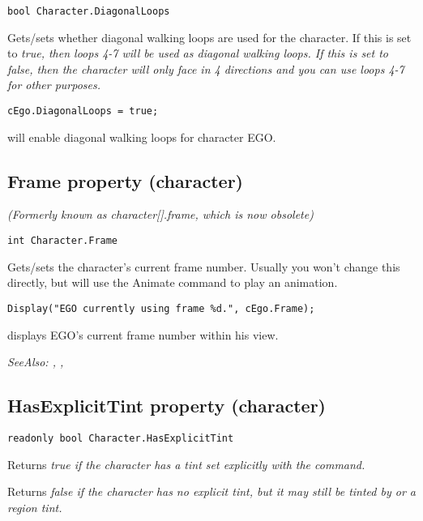 \begin{verbatim}
bool Character.DiagonalLoops
\end{verbatim}
Gets/sets whether diagonal walking loops are used for the character. If this is set
to \it{true}, then loops 4-7 will be used as diagonal walking loops. If this is set to
\it{false}, then the character will only face in 4 directions and you can use
loops 4-7 for other purposes.

\begin{verbatim}
cEgo.DiagonalLoops = true;
\end{verbatim}
will enable diagonal walking loops for character EGO.


\subsection{Frame property (character)}\label{Character.Frame}%

\it{(Formerly known as character[].frame, which is now obsolete)}

\begin{verbatim}
int Character.Frame
\end{verbatim}
Gets/sets the character's current frame number. Usually you won't change this
directly, but will use the Animate command to play an animation.

\begin{verbatim}
Display("EGO currently using frame %d.", cEgo.Frame);
\end{verbatim}
displays EGO's current frame number within his view.

\it{SeeAlso:} ,
,


\subsection{HasExplicitTint property (character)}\label{Character.HasExplicitTint}%

\begin{verbatim}
readonly bool Character.HasExplicitTint
\end{verbatim}
Returns \it{true} if the character has a tint set explicitly with the
 command.

Returns \it{false} if the character has no explicit tint, but it may still be
tinted by  or a region tint.

